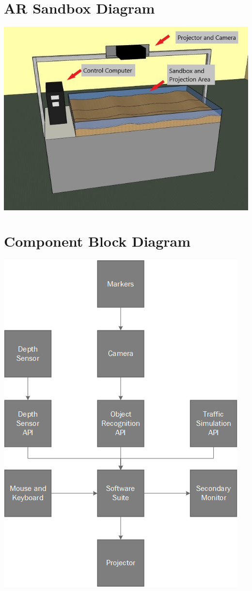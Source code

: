 \documentclass[letterpaper, 10pt, onecolumn, draftclsnofoot]{IEEEtran}
\begin{document}
       
\newpage
\appendices
    \section{AR Sandbox Diagram}
    \label{ARSandboxDiagram}
        \begin{center}
        \includegraphics{ARSandbox.jpg}
        \end{center}
    \section{Component Block Diagram}
    \label{ComponentBlockDiagram}
        \begin{center}
        \includegraphics{BlockDiagram.png}
        \end{center}
\end{document}
